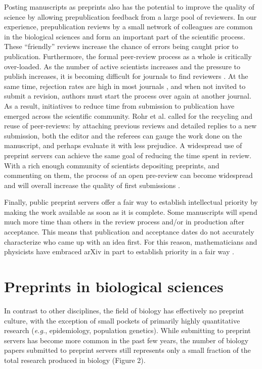 \documentclass[10pt]{article}
\begin{document}
Posting manuscripts as preprints also has the potential to improve the 
quality of science by allowing prepublication feedback from a large pool of 
reviewers. In our experience, prepublication reviews by a small network of 
colleagues are common in the biological sciences and form an important part 
of the scientific process. These ``friendly'' reviews increase the chance 
of errors being caught prior to publication. Furthermore, the formal 
peer-review process as a whole is critically over-loaded. As the number of 
active scientists increases and the pressure to publish increases, it is 
becoming difficult for journals to find reviewers \cite{hoc09}.  At the same 
time, rejection rates are high in most journals \cite{aar08,roh09}, and when 
not invited to submit a revision, authors must start the process over again 
at another journal. As a result, initiatives to reduce time from submission 
to publication have emerged across the scientific community. Rohr et al.  
\cite{roh09} called for the recycling and reuse of peer-reviews: by 
attaching previous reviews and detailed replies to a new submission, both 
the editor and the referees can gauge the work done on the manuscript, and 
perhaps evaluate it with less prejudice. A widespread use of preprint 
servers can achieve the same goal of reducing the time spent in review. With 
a rich enough community of scientists depositing preprints, and commenting 
on them, the process of an open pre-review can become widespread and will 
overall increase the quality of first submissions \cite{hoc12}.

Finally, public preprint servers offer a fair way to establish intellectual
priority by making the work available as soon as it is complete. Some
manuscripts will spend much more time than others in the review process and/or in
production after acceptance. This means that publication and
acceptance dates do not accurately characterize who came up with an idea
first. For this reason, mathematicians and physicists have embraced arXiv in
part to establish priority in a fair way \cite{gin11,cal12}.

\section*{Preprints in biological sciences}

In contrast to other disciplines, the field of biology has effectively no
preprint culture, with the exception of small pockets of primarily highly
quantitative research (\emph{e.g.}, epidemiology, population genetics).  While
submitting to preprint servers has become more common in the past few years, the
number of biology papers submitted to preprint servers still represents only a
small fraction of the total research produced in biology (Figure 2).
\end{document}
